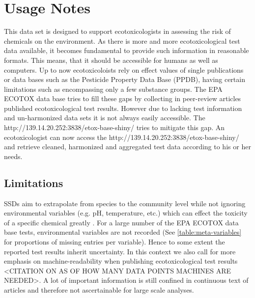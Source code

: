 \documentclass[english]{article}
\newcommand{\epa}{EPA ECOTOX data base}
\newcommand{\app}{http://139.14.20.252:3838/etox-base-shiny/}
\begin{document}
\section*{Usage Notes}
This data set is designed to support ecotoxicologists in assessing the risk of chemicals on the environment. As there is more and more ecotoxicological test data available, it becomes fundamental to provide such information in reasonable formats. This means, that it should be accessible for humans as well as computers. Up to now ecotoxicoloists rely on effect values of single publications or data bases such as the Pesticide Property Data Base (PPDB), having certain limitations such as encompassing only a few substance groups. The \epa{} tries to fill these gaps by collecting in peer-review articles published ecotoxicological test results. However due to lacking test information and un-harmonized data sets it is not always easily accessible. The \app{} tries to mitigate this gap. An ecotoxicologist can now access the \app{} and retrieve cleaned, harmonized and aggregated test data according to his or her needs.

\subsection*{Limitations}

SSDs aim to extrapolate from species to the community level while not ignoring environmental variables (e.g. pH, temperature, etc.) which can effect the toxicity of a specific chemical greatly \citep{posthuma_species_2002}. For a large number of the \epa{} tests, environmental variables are not recorded (See \ref{table:meta-variables} for proportions of missing entries per variable). Hence to some extent the reported test results inherit uncertainty. In this context we also call for more emphasis on machine-readability when publishing ecotoxicological test results <CITATION ON AS OF HOW MANY DATA POINTS MACHINES ARE NEEDED>. A lot of important information is still confined in continuous text of articles and therefore not ascertainable for large scale analyses.
\end{document}
